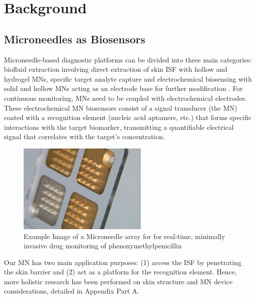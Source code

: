 \section{Background}
\vspace{-0.5cm}
\subsection{Microneedles as Biosensors}
\vspace{-0.5cm}
Microneedle-based diagnostic platforms can be divided into three main categories: biofluid extraction involving direct extraction of skin ISF with hollow and hydrogel MNs, specific target analyte capture and electrochemical biosensing with solid and hollow MNs acting as an electrode base for further modification \cite{dixon2021microneedle}. For continuous monitoring, MNs need to be coupled with electrochemical electrodes. These electrochemical MN biosensors consist of a signal transducer (the MN) coated with a recognition element (nucleic acid aptamers, etc.) that forms specific interactions with the target biomarker, transmitting a quantifiable electrical signal that correlates with the target’s concentration.
\begin{center}
    \begin{figure}[H]
    \centering
    \includegraphics[width=.4\textwidth]{img/microneedle_patch.png}
    \caption{Example Image of a Microneedle array for for real-time, minimally invasive drug monitoring of phenoxymethylpenicillin \cite{rawson2019microneedle}}
    \label{fig:microneedle}
\end{figure}
\end{center}
\vspace{-1cm}
Our MN has two main application purposes: (1) access the ISF by penetrating the skin barrier and (2) act as a platform for the recognition element. Hence, more holistic research has been performed on skin structure and MN device considerations, detailed in Appendix Part A.

